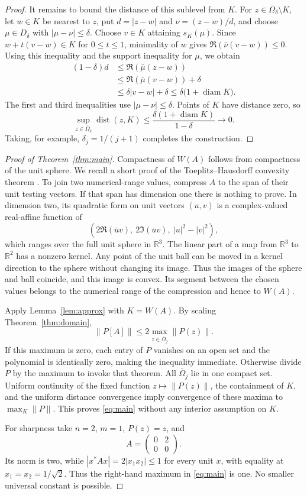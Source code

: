 \documentclass[11pt]{article}
\DeclareMathOperator{\dist}{dist}
\theoremstyle{remark}\newtheorem{remark}[theorem]{Remark}
\numberwithin{equation}{section}
\begin{document}
\begin{proof}
It remains to bound the distance of this sublevel from $K$. For
$z\in\overline\Omega_\delta\setminus K$, let $w\in K$ be nearest to $z$,
put $d=|z-w|$ and $\nu=(z-w)/d$, and choose $\mu\in D_\delta$ with
$|\mu-\nu|\le\delta$. Choose $v\in K$ attaining $s_K(\mu)$.
Since $w+t(v-w)\in K$ for $0\le t\le1$, minimality of $w$ gives
$\Re(\bar\nu(v-w))\le0$.
Using this inequality and the support inequality for $\mu$, we obtain
\[
 \begin{aligned}
 (1-\delta)d
 &\le\Re(\bar\mu(z-w))\\
 &\le\Re(\bar\mu(v-w))+\delta\\
 &\le\delta|v-w|+\delta
 \le\delta\bigl(1+\operatorname{diam}K\bigr).
 \end{aligned}
\]
The first and third inequalities use $|\mu-\nu|\le\delta$. Points of $K$
have distance zero, so
\[
 \sup_{z\in\overline\Omega_\delta}\dist(z,K)
 \le\frac{\delta(1+\operatorname{diam}K)}{1-\delta}\longrightarrow0.
\]
Taking, for example, $\delta_j=1/(j+1)$ completes the construction.
\end{proof}

\begin{proof}[Proof of Theorem~\ref{thm:main}]
Compactness of $W(A)$ follows from compactness of the unit sphere. We recall a short proof of the Toeplitz--Hausdorff convexity theorem \cite{Toeplitz1918,Hausdorff1919}. To join two numerical-range values, compress $A$ to the span of their unit testing vectors. If that span has dimension one there is nothing to prove. In dimension two, its quadratic form on unit vectors $(u,v)$ is a complex-valued real-affine function of
\[
 (2\Re(\bar uv),\ 2\Im(\bar uv),\ |u|^2-|v|^2),
\]
which ranges over the full unit sphere in $\mathbb R^3$. The linear part of a map from $\mathbb R^3$ to $\mathbb R^2$ has a nonzero kernel. Any point of the unit ball can be moved in a kernel direction to the sphere without changing its image. Thus the images of the sphere and ball coincide, and this image is convex. Its segment between the chosen values belongs to the numerical range of the compression and hence to $W(A)$.

Apply Lemma~\ref{lem:approx} with $K=W(A)$. By scaling Theorem~\ref{thm:domain},
\[
 \|P[A]\|\le2\max_{z\in\overline\Omega_j}\|P(z)\|.
\]
If this maximum is zero, each entry of $P$ vanishes on an open set and the polynomial is identically zero, making the inequality immediate. Otherwise divide $P$ by the maximum to invoke that theorem. All $\overline\Omega_j$ lie in one compact set. Uniform continuity of the fixed function $z\mapsto\|P(z)\|$, the containment of $K$, and the uniform distance convergence imply convergence of these maxima to $\max_K\|P\|$. This proves \eqref{eq:main} without any interior assumption on $K$.

For sharpness take $n=2$, $m=1$, $P(z)=z$, and
\[
 A=\begin{pmatrix}0&2\\0&0\end{pmatrix}.
\]
Its norm is two, while $|x^*Ax|=2|x_1x_2|\le1$ for every unit $x$, with equality at $x_1=x_2=1/\sqrt2$. Thus the right-hand maximum in \eqref{eq:main} is one. No smaller universal constant is possible.
\end{proof}
\appendix
\end{document}
